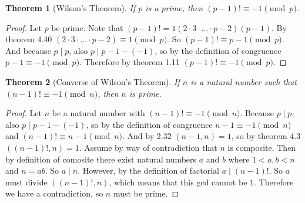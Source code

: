 \documentclass[12pt,leqno]{article}
\numberwithin{equation}{section}
\newtheorem{thm}{Theorem}[section]
\theoremstyle{definition}
\begin{document}

\begin{thm}[Wilson's Theorem]
If $p$ is a prime, then $(p - 1)! \equiv -1 \pmod{p}$.
\end{thm}
\begin{proof}[Proof]
Let $p$ be prime.  Note that $(p - 1)! = 1(2\cdot 3\cdot \hdots \cdot p-2)(p-1)$.  By theorem 4.40 $(2\cdot 3\cdot \hdots \cdot p-2) \equiv 1 \pmod{p}$.  So $(p-1)! \equiv p-1 \pmod{p}$.  And because $p \mid p$, also $p \mid p-1 - (-1)$, so by the definition of congruence $p-1 \equiv -1 \pmod{p}$.  Therefore by theorem 1.11 $(p - 1)! \equiv -1 \pmod{p}$.
\end{proof}

\begin{thm}[Converse of Wilson's Theorem]
If $n$ is a natural number such that $(n - 1)! \equiv -1 \pmod{n}$,
then $n$ is prime.
\end{thm}
\begin{proof}[Proof]
Let $n$ be a natural number with $(n - 1)! \equiv -1 \pmod{n}$.  Because $p \mid p$, also $p \mid p-1 - (-1)$, so by the definition of congruence $n-1 \equiv -1 \pmod{n}$ and $(n - 1)! \equiv n-1 \pmod{n}$.  And by 2.32 $(n-1, n) = 1$, so by theorem 4.3 $((n-1)!, n) = 1$.  Assume by way of contradiction that $n$ is composite.  Then by definition of comosite there exist natural numbers $a$ and $b$ where $1 < a, b < n$ and $n = ab$.  So $a \mid n$.  However, by the definition of factorial $a \mid (n-1)!$.  So $a$ must divide $((n-1)!, n)$, which means that this gcd cannot be 1.  Therefore we have a contradiction, so $n$ must be prime.
\end{proof}
\end{document}
